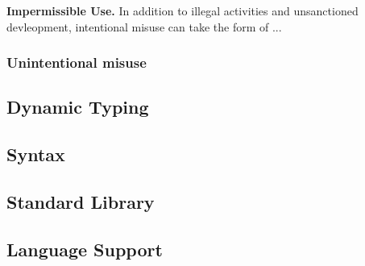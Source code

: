 			\textbf{Impermissible Use.}
			In addition to illegal activities and unsanctioned devleopment, intentional misuse can take the form of ...


		\subsubsection{Unintentional misuse}
			
	\subsection{Dynamic Typing}

	\subsection{Syntax}

	\subsection{Standard Library}

	\subsection{Language Support}